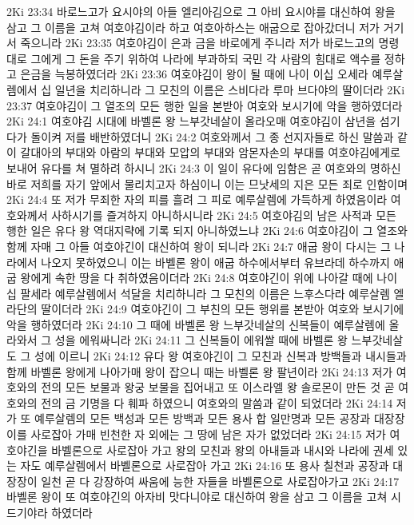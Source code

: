 2Ki 23:34  바로느고가 요시야의 아들 엘리아김으로 그 아비 요시야를 대신하여 왕을 삼고 그 이름을 고쳐 여호야김이라 하고 여호아하스는 애굽으로 잡아갔더니 저가 거기서 죽으니라
2Ki 23:35  여호야김이 은과 금을 바로에게 주니라 저가 바로느고의 명령대로 그에게 그 돈을 주기 위하여 나라에 부과하되 국민 각 사람의 힘대로 액수를 정하고 은금을 늑봉하였더라
2Ki 23:36  여호야김이 왕이 될 때에 나이 이십 오세라 예루살렘에서 십 일년을 치리하니라 그 모친의 이름은 스비다라 루마 브다야의 딸이더라
2Ki 23:37  여호야김이 그 열조의 모든 행한 일을 본받아 여호와 보시기에 악을 행하였더라
2Ki 24:1  여호야김 시대에 바벨론 왕 느부갓네살이 올라오매 여호야김이 삼년을 섬기다가 돌이켜 저를 배반하였더니
2Ki 24:2  여호와께서 그 종 선지자들로 하신 말씀과 같이 갈대아의 부대와 아람의 부대와 모압의 부대와 암몬자손의 부대를 여호야김에게로 보내어 유다를 쳐 멸하려 하시니
2Ki 24:3  이 일이 유다에 임함은 곧 여호와의 명하신바로 저희를 자기 앞에서 물리치고자 하심이니 이는 므낫세의 지은 모든 죄로 인함이며
2Ki 24:4  또 저가 무죄한 자의 피를 흘려 그 피로 예루살렘에 가득하게 하였음이라 여호와께서 사하시기를 즐겨하지 아니하시니라
2Ki 24:5  여호야김의 남은 사적과 모든 행한 일은 유다 왕 역대지략에 기록 되지 아니하였느냐
2Ki 24:6  여호야김이 그 열조와 함께 자매 그 아들 여호야긴이 대신하여 왕이 되니라
2Ki 24:7  애굽 왕이 다시는 그 나라에서 나오지 못하였으니 이는 바벨론 왕이 애굽 하수에서부터 유브라데 하수까지 애굽 왕에게 속한 땅을 다 취하였음이더라
2Ki 24:8  여호야긴이 위에 나아갈 때에 나이 십 팔세라 예루살렘에서 석달을 치리하니라 그 모친의 이름은 느후스다라 예루살렘 엘라단의 딸이더라
2Ki 24:9  여호야긴이 그 부친의 모든 행위를 본받아 여호와 보시기에 악을 행하였더라
2Ki 24:10  그 때에 바벨론 왕 느부갓네살의 신복들이 예루살렘에 올라와서 그 성을 에워싸니라
2Ki 24:11  그 신복들이 에워쌀 때에 바벨론 왕 느부갓네살도 그 성에 이르니
2Ki 24:12  유다 왕 여호야긴이 그 모친과 신복과 방백들과 내시들과 함께 바벨론 왕에게 나아가매 왕이 잡으니 때는 바벨론 왕 팔년이라
2Ki 24:13  저가 여호와의 전의 모든 보물과 왕궁 보물을 집어내고 또 이스라엘 왕 솔로몬이 만든 것 곧 여호와의 전의 금 기명을 다 훼파 하였으니 여호와의 말씀과 같이 되었더라
2Ki 24:14  저가 또 예루살렘의 모든 백성과 모든 방백과 모든 용사 합 일만명과 모든 공장과 대장장이를 사로잡아 가매 빈천한 자 외에는 그 땅에 남은 자가 없었더라
2Ki 24:15  저가 여호야긴을 바벨론으로 사로잡아 가고 왕의 모친과 왕의 아내들과 내시와 나라에 권세 있는 자도 예루살렘에서 바벨론으로 사로잡아 가고
2Ki 24:16  또 용사 칠천과 공장과 대장장이 일천 곧 다 강장하여 싸움에 능한 자들을 바벨론으로 사로잡아가고
2Ki 24:17  바벨론 왕이 또 여호야긴의 아자비 맛다니야로 대신하여 왕을 삼고 그 이름을 고쳐 시드기야라 하였더라
